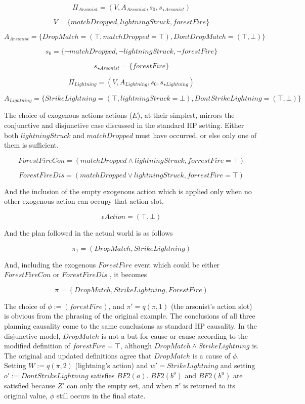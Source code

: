 \documentclass{article}
\theoremstyle{plain}
\theoremstyle{definition}
\begin{document}
\[
\Pi_{Arsonist} = (V, A_{Arsonist}, s_0, s_{\star Arsonist})
\]

\[
V = \{matchDropped, lightningStruck, forestFire\}
\]

\[
A_{Arsonist} = \{ DropMatch = (\top, matchDropped = \top), DontDropMatch = (\top, \bot) \}
\]

\[
s_0 = \{\lnot matchDropped, \lnot lightningStruck, \lnot forestFire \}
\]

\[
s_{\star Arsonist} = \{ forestFire \}
\]

\[
\Pi_{Lightning} = (V, A_{Lightning}, s_0, s_{\star Lightning})
\]

\[
A_{Lightning}=\{ StrikeLightning = (\top, lightningStruck=\bot), DontStrikeLightning = (\top, \bot) \}
\]

The choice of exogenous actions actions ($E$), at their simplest, mirrors the conjunctive and disjunctive case discussed in the standard HP setting. Either both $lightningStruck$ and $matchDropped$ must have occurred, or else only one of them is sufficient.

\[
ForestFireCon = ( matchDropped \land lightningStruck, forrestFire = \top )
\]

\[
ForestFireDis = ( matchDropped \lor lightningStruck, forrestFire = \top )
\]

And the inclusion of the empty exogenous action which is applied only when no other exogenous action can occupy that action slot.

\[
\epsilon Action = (\top, \bot)
\]

And the plan followed in the actual world is as follows

\[
\pi_1 = (DropMatch, StrikeLightning)
\]

And, including the exogenous $ForestFire$ event which could be either $ForestFireCon$ or $ForestFireDis$ , it becomes

\[
\pi = (DropMatch, StrikeLightning, ForestFire)
\]

The choice of $\phi:=(forestFire)$, and $\pi'=q(\pi,1)$ (the arsonist's action slot) is obvious from the phrasing of the original example. The conclusions of all three planning causality come to the same conclusions as standard HP causality. In the disjunctive model, $DropMatch$ is not a but-for cause or cause according to the modified definition of $forestFire=\top$, although $DropMatch \land StrikeLightning$ is. The original and updated definitions agree that $DropMatch$ is a cause of $\phi$. Setting $W:= q(\pi,2)$ (lightning's action) and $w'=StrikeLightning$ and setting $o':= DontStrikeLightning$ satisfies $BF2(a)$. $BF2(b^o)$ and $BF2(b^u)$ are satisfied because $Z'$ can only the empty set, and when $\pi'$ is returned to its original value, $\phi$ still occurs in the final state.
\end{document}
